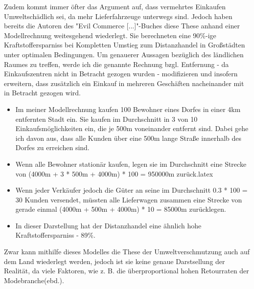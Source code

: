 





\begin{folding} %

Zudem kommt immer öfter das Argument auf, dass vermehrtes Einkaufen Umweltschädlich sei, da mehr Lieferfahrzeuge unterwegs sind. Jedoch haben bereits die Autoren des "Evil Commerce [...]"-Buches diese These anhand einer Modellrechnung weitesgehend wiederlegt. Sie berechneten eine 90\%-ige Kraftstoffersparniss bei Kompletten Umstieg zum Distanzhandel in Großstädten unter optimalen Bedingungen\cite[S. 25f]{evilcom}. Um genauerer Aussagen bezüglich des ländlichen Raumes zu treffen, werde ich die genannte Rechnung bzgl. Entfernung - da Einkaufszentren nicht in Betracht gezogen wurden - modifizieren und insofern erweitern, dass zusätzlich ein Einkauf in mehreren Geschäften nacheinander mit in Betracht gezogen wird.

\begin{itemize}
\item Im meiner Modellrechnung kaufen 100 Bewohner eines Dorfes in einer 4km entfernten Stadt ein. Sie kaufen im Durchschnitt in 3 von 10 Einkaufsmöglichkeiten ein, die je 500m voneinander entfernt sind. Dabei gehe ich davon aus, dass alle Kunden über eine 500m lange Straße innerhalb des Dorfes zu erreichen sind.

\item Wenn alle Bewohner stationär kaufen, legen sie im Durchschnitt eine Strecke von (4000m + 3 * 500m + 4000m) * 100 = 950000m zurück.latex

\item Wenn jeder Verkäufer jedoch die Güter an seine im Durchschnitt 0.3 * 100 = 30 Kunden versendet, müssten alle Lieferwagen zusammen eine Strecke von gerade einmal (4000m + 500m + 4000m) * 10 = 85000m zurücklegen.

\item In dieser Darstellung hat der Distanzhandel eine ähnlich hohe Kraftstoffersparniss - 89\%. 
\end{itemize}
Zwar kann mithilfe dieses Modelles die These der Umweltverschmutzung auch auf dem Land wiederlegt werden, jedoch ist sie keine genaue Darstsellung der Realität, da viele Faktoren, wie z. B. die überproportional hohen Retourraten der Modebranche(ebd.).

\end{folding}
